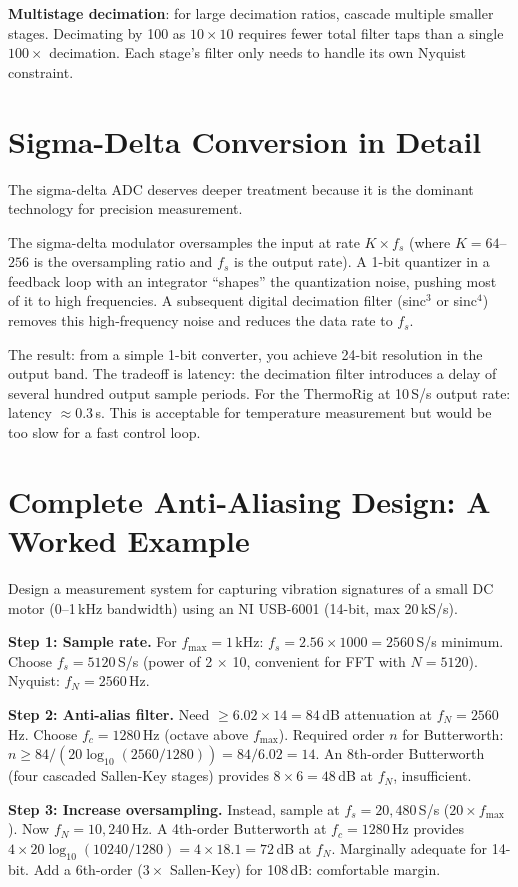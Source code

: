 \documentclass[11pt,letterpaper,twoside,openany]{book}
\begin{document}
\textbf{Multistage decimation}: for large decimation ratios, cascade multiple smaller stages. Decimating by 100 as $10 \times 10$ requires fewer total filter taps than a single $100\times$ decimation. Each stage's filter only needs to handle its own Nyquist constraint.

\section{Sigma-Delta Conversion in Detail}
The sigma-delta ADC deserves deeper treatment because it is the dominant technology for precision measurement.

The sigma-delta modulator oversamples the input at rate $K \times f_s$ (where $K = 64$--$256$ is the oversampling ratio and $f_s$ is the output rate). A 1-bit quantizer in a feedback loop with an integrator ``shapes'' the quantization noise, pushing most of it to high frequencies. A subsequent digital decimation filter (sinc$^3$ or sinc$^4$) removes this high-frequency noise and reduces the data rate to $f_s$.

The result: from a simple 1-bit converter, you achieve 24-bit resolution in the output band. The tradeoff is latency: the decimation filter introduces a delay of several hundred output sample periods. For the ThermoRig at 10\,S/s output rate: latency $\approx 0.3$\,s. This is acceptable for temperature measurement but would be too slow for a fast control loop.
\section{Complete Anti-Aliasing Design: A Worked Example}
Design a measurement system for capturing vibration signatures of a small DC motor (0--1\,kHz bandwidth) using an NI USB-6001 (14-bit, max 20\,kS/s).

\textbf{Step 1: Sample rate.} For $f_{\max} = 1$\,kHz: $f_s = 2.56 \times 1000 = 2560$\,S/s minimum. Choose $f_s = 5120$\,S/s (power of 2 $\times$ 10, convenient for FFT with $N = 5120$). Nyquist: $f_N = 2560$\,Hz.

\textbf{Step 2: Anti-alias filter.} Need $\geq 6.02 \times 14 = 84$\,dB attenuation at $f_N = 2560$\,Hz. Choose $f_c = 1280$\,Hz (octave above $f_{\max}$). Required order $n$ for Butterworth: $n \geq 84/(20\log_{10}(2560/1280)) = 84/6.02 = 14$. An 8th-order Butterworth (four cascaded Sallen-Key stages) provides $8 \times 6 = 48$\,dB at $f_N$, insufficient.

\textbf{Step 3: Increase oversampling.} Instead, sample at $f_s = 20{,}480$\,S/s ($20\times f_{\max}$). Now $f_N = 10{,}240$\,Hz. A 4th-order Butterworth at $f_c = 1280$\,Hz provides $4 \times 20\log_{10}(10240/1280) = 4 \times 18.1 = 72$\,dB at $f_N$. Marginally adequate for 14-bit. Add a 6th-order ($3\times$ Sallen-Key) for 108\,dB: comfortable margin.
\end{document}
